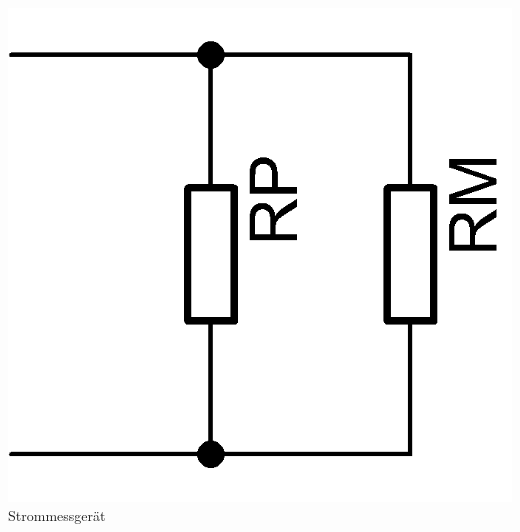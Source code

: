 \begin{frame}
\begin{columns}
\begin{center}
      \includegraphics[width=\textwidth,height=.5\textheight,keepaspectratio]{a16/Messbereichserweiterung-Strom.png}\\
      Strommessgerät
    \end{center}
  \end{columns}
\end{frame}

